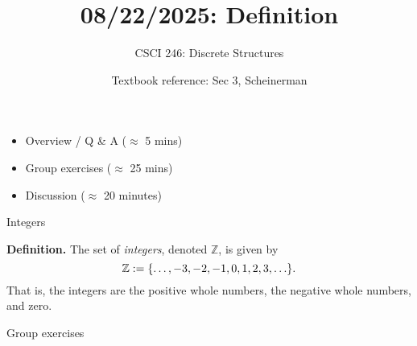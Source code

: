 \documentclass[10pt]{beamer}
\begin{document}




\title{08/22/2025: Definition}
\author{CSCI 246: Discrete Structures}
\date{Textbook reference: Sec 3, Scheinerman}

\begin{frame}
    \titlepage 
\end{frame}

\begin{frame}
\begin{myyellowbox}[title=Today's Agenda]
\begin{itemize}
	\item Overview / Q \& A ($\approx$ 5 mins)
	\item Group exercises ($\approx$ 25 mins)
	\item Discussion ($\approx$ 20 minutes)
\end{itemize}


\end{myyellowbox}
\vfill 

\end{frame}





%

\begin{frame}{Integers}

\begin{mygreenbox}
\textbf{Definition.} The set of \textit{integers}, denoted $\mathbb{Z}$, is given by
\[\mathbb{Z} := \{ {\hdots, -3, -2, -1, 0, 1, 2, 3, \hdots} \}. \]
That is, the integers are the positive whole numbers, the negative whole numbers, and zero.
\end{mygreenbox}

\end{frame}


\begin{frame}[standout]
Group exercises
\end{frame}
\end{document}
